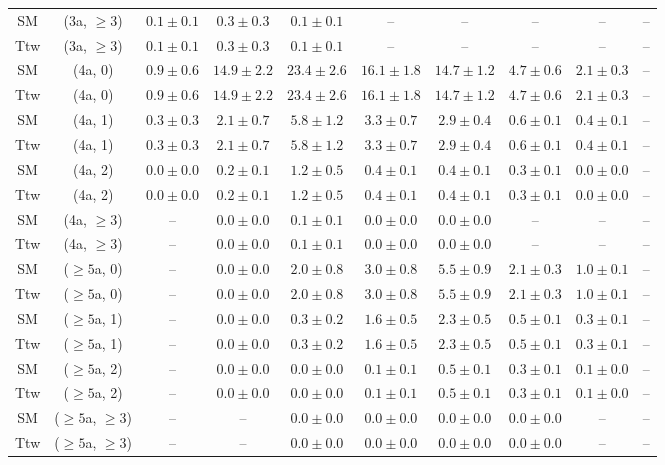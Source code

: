 \begin{table}[h!]
{\begin{tabular}{cccccccccc}
	SM & (3a, $\ge3$) & $0.1\pm 0.1$ & $0.3\pm 0.3$ & $0.1\pm 0.1$ & -- & -- & -- & -- & -- \\[0.5ex] 
	Ttw & (3a, $\ge3$) & $0.1\pm 0.1$ & $0.3\pm 0.3$ & $0.1\pm 0.1$ & -- & -- & -- & -- & -- \\[0.5ex] 
	SM & (4a, 0) & $0.9\pm 0.6$ & $14.9\pm 2.2$ & $23.4\pm 2.6$ & $16.1\pm 1.8$ & $14.7\pm 1.2$ & $4.7\pm 0.6$ & $2.1\pm 0.3$ & -- \\[0.5ex] 
	Ttw & (4a, 0) & $0.9\pm 0.6$ & $14.9\pm 2.2$ & $23.4\pm 2.6$ & $16.1\pm 1.8$ & $14.7\pm 1.2$ & $4.7\pm 0.6$ & $2.1\pm 0.3$ & -- \\[0.5ex] 
	SM & (4a, 1) & $0.3\pm 0.3$ & $2.1\pm 0.7$ & $5.8\pm 1.2$ & $3.3\pm 0.7$ & $2.9\pm 0.4$ & $0.6\pm 0.1$ & $0.4\pm 0.1$ & -- \\[0.5ex] 
	Ttw & (4a, 1) & $0.3\pm 0.3$ & $2.1\pm 0.7$ & $5.8\pm 1.2$ & $3.3\pm 0.7$ & $2.9\pm 0.4$ & $0.6\pm 0.1$ & $0.4\pm 0.1$ & -- \\[0.5ex] 
	SM & (4a, 2) & $0.0\pm 0.0$ & $0.2\pm 0.1$ & $1.2\pm 0.5$ & $0.4\pm 0.1$ & $0.4\pm 0.1$ & $0.3\pm 0.1$ & $0.0\pm 0.0$ & -- \\[0.5ex] 
	Ttw & (4a, 2) & $0.0\pm 0.0$ & $0.2\pm 0.1$ & $1.2\pm 0.5$ & $0.4\pm 0.1$ & $0.4\pm 0.1$ & $0.3\pm 0.1$ & $0.0\pm 0.0$ & -- \\[0.5ex] 
	SM & (4a, $\ge3$) & -- & $0.0\pm 0.0$ & $0.1\pm 0.1$ & $0.0\pm 0.0$ & $0.0\pm 0.0$ & -- & -- & -- \\[0.5ex] 
	Ttw & (4a, $\ge3$) & -- & $0.0\pm 0.0$ & $0.1\pm 0.1$ & $0.0\pm 0.0$ & $0.0\pm 0.0$ & -- & -- & -- \\[0.5ex] 
	SM & ($\ge5$a, 0) & -- & $0.0\pm 0.0$ & $2.0\pm 0.8$ & $3.0\pm 0.8$ & $5.5\pm 0.9$ & $2.1\pm 0.3$ & $1.0\pm 0.1$ & -- \\[0.5ex] 
	Ttw & ($\ge5$a, 0) & -- & $0.0\pm 0.0$ & $2.0\pm 0.8$ & $3.0\pm 0.8$ & $5.5\pm 0.9$ & $2.1\pm 0.3$ & $1.0\pm 0.1$ & -- \\[0.5ex] 
	SM & ($\ge5$a, 1) & -- & $0.0\pm 0.0$ & $0.3\pm 0.2$ & $1.6\pm 0.5$ & $2.3\pm 0.5$ & $0.5\pm 0.1$ & $0.3\pm 0.1$ & -- \\[0.5ex] 
	Ttw & ($\ge5$a, 1) & -- & $0.0\pm 0.0$ & $0.3\pm 0.2$ & $1.6\pm 0.5$ & $2.3\pm 0.5$ & $0.5\pm 0.1$ & $0.3\pm 0.1$ & -- \\[0.5ex] 
	SM & ($\ge5$a, 2) & -- & $0.0\pm 0.0$ & $0.0\pm 0.0$ & $0.1\pm 0.1$ & $0.5\pm 0.1$ & $0.3\pm 0.1$ & $0.1\pm 0.0$ & -- \\[0.5ex] 
	Ttw & ($\ge5$a, 2) & -- & $0.0\pm 0.0$ & $0.0\pm 0.0$ & $0.1\pm 0.1$ & $0.5\pm 0.1$ & $0.3\pm 0.1$ & $0.1\pm 0.0$ & -- \\[0.5ex] 
	SM & ($\ge5$a, $\ge3$) & -- & -- & $0.0\pm 0.0$ & $0.0\pm 0.0$ & $0.0\pm 0.0$ & $0.0\pm 0.0$ & -- & -- \\[0.5ex] 
	Ttw & ($\ge5$a, $\ge3$) & -- & -- & $0.0\pm 0.0$ & $0.0\pm 0.0$ & $0.0\pm 0.0$ & $0.0\pm 0.0$ & -- & -- \\[0.5ex] 
	\hline
	\hline
\end{tabular}}
\end{table}
